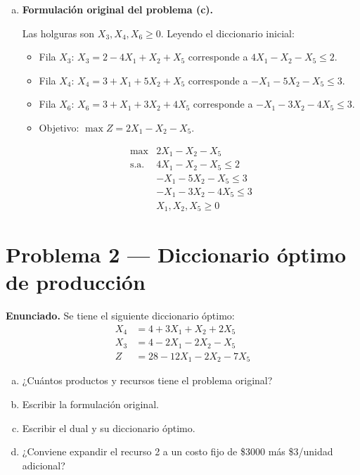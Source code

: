 \documentclass{article}
\begin{document}
\begin{enumerate}[a)]
Todos los costos reducidos son $-\frac{1}{2} < 0$ \textbf{[BT §3.2]}: óptimo alcanzado. $Z^* = 81$, SBF $= \left(\tfrac{1}{2}, \tfrac{7}{2}, \tfrac{7}{2}\right)$ no degenerada.

\item \textbf{Formulación original del problema (c).}

Las holguras son $X_3, X_4, X_6 \geq 0$. Leyendo el diccionario inicial:
\begin{itemize}
  \item Fila $X_3$: $X_3 = 2 - 4X_1 + X_2 + X_5$ corresponde a $4X_1 - X_2 - X_5 \leq 2$.
  \item Fila $X_4$: $X_4 = 3 + X_1 + 5X_2 + X_5$ corresponde a $-X_1 - 5X_2 - X_5 \leq 3$.
  \item Fila $X_6$: $X_6 = 3 + X_1 + 3X_2 + 4X_5$ corresponde a $-X_1 - 3X_2 - 4X_5 \leq 3$.
  \item Objetivo: $\max Z = 2X_1 - X_2 - X_5$.
\end{itemize}

\[
\begin{array}{ll}
\max & 2X_1 - X_2 - X_5 \\[2pt]
\text{s.a.} & 4X_1 - X_2 - X_5 \leq 2 \\
& -X_1 - 5X_2 - X_5 \leq 3 \\
& -X_1 - 3X_2 - 4X_5 \leq 3 \\
& X_1, X_2, X_5 \geq 0
\end{array}
\]

\end{enumerate}

\section*{Problema 2 --- Diccionario óptimo de producción}

\textbf{Enunciado.} Se tiene el siguiente diccionario óptimo:
\begin{align*}
X_4 &= 4 + 3X_1 + X_2 + 2X_5 \\
X_3 &= 4 - 2X_1 - 2X_2 - X_5 \\
Z   &= 28 - 12X_1 - 2X_2 - 7X_5
\end{align*}
\begin{enumerate}[a)]
  \item ¿Cuántos productos y recursos tiene el problema original?
  \item Escribir la formulación original.
  \item Escribir el dual y su diccionario óptimo.
  \item ¿Conviene expandir el recurso 2 a un costo fijo de \$3000 más \$3/unidad adicional?
\end{enumerate}
\end{document}
